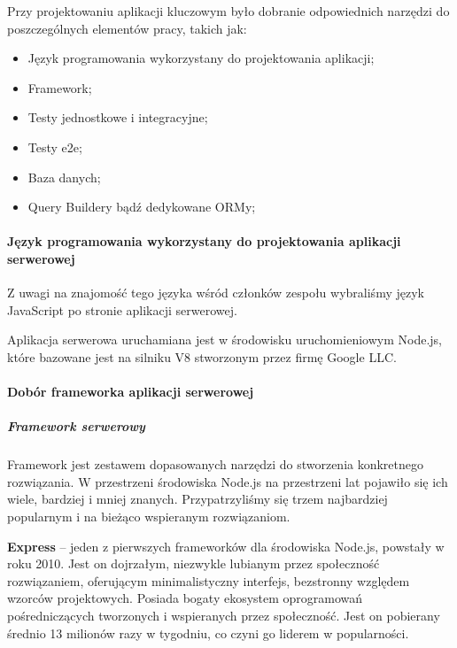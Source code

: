 \documentclass[12pt, a4paper, twoside, openany]{book}
\begin{document}
Przy projektowaniu aplikacji kluczowym było dobranie odpowiednich narzędzi do
poszczególnych elementów pracy, takich jak:
\begin{itemize}
    \item Język programowania wykorzystany do projektowania aplikacji;
    \item Framework;
    \item Testy jednostkowe i integracyjne; %
    \item Testy e2e; %
    \item Baza danych; %
    \item Query Buildery bądź dedykowane ORMy; %
\end{itemize}

\paragraph{Język programowania wykorzystany do projektowania aplikacji serwerowej\\}

Z uwagi na znajomość tego języka wśród członków zespołu wybraliśmy język JavaScript
po stronie aplikacji serwerowej.

Aplikacja serwerowa uruchamiana jest w środowisku uruchomieniowym Node.js, które bazowane jest na
silniku V8 stworzonym przez firmę Google LLC.

\paragraph{Dobór frameworka aplikacji serwerowej}
\subparagraph{Framework serwerowy\\}

Framework jest zestawem dopasowanych narzędzi do stworzenia konkretnego rozwiązania.
W przestrzeni środowiska Node.js na przestrzeni lat pojawiło się ich wiele, bardziej i
mniej znanych. Przypatrzyliśmy się trzem najbardziej popularnym i na bieżąco wspieranym
rozwiązaniom.

\textbf{Express} -- jeden z pierwszych frameworków dla środowiska Node.js, powstały w roku 2010.
Jest on dojrzałym, niezwykle lubianym przez społeczność rozwiązaniem, oferującym
minimalistyczny interfejs, bezstronny względem wzorców projektowych. Posiada bogaty ekosystem
oprogramowań pośredniczących tworzonych i wspieranych przez społeczność.
Jest on pobierany średnio 13 milionów razy w tygodniu, co czyni go liderem w popularności.
\end{document}
